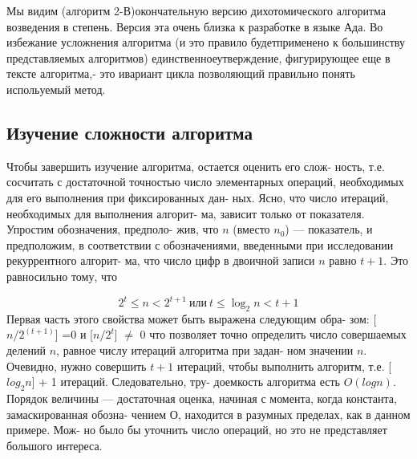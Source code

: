  Мы видим (алгоритм 2-В)окончательную версию дихотомического\linebreak
алгоритма возведения в степень. Версия эта очень близка к разработке \linebreak
в языке Ада. Во избежание усложнения алгоритма (и это правило будет\linebreak применено к большинству представляемых алгоритмов) единственное\linebreak утверждение, фигурирующее еще в тексте алгоритма,- это ивариант\linebreak
 цикла позволяющий правильно понять испольуемый метод.
\newline

\subsection{Изучение сложности алгоритма}
\noindent Чтобы завершить изучение алгоритма, остается оценить его слож­-\linebreak
ность, т.е. сосчитать с достаточной точностью число элементарных\linebreak
операций, необходимых для его выполнения при фиксированных дан­-\linebreak
ных. Ясно, что число итераций, необходимых для выполнения алгорит­-\linebreak
ма, зависит только от показателя. Упростим обозначения, предполо­-\linebreak
жив, что $n$ (вместо $n_0$) — показатель, и предположим, в соответствии с\linebreak
обозначениями, введенными при исследовании рекуррентного алгорит­-\linebreak
ма, что число цифр в двоичной записи $n$ равно $t + 1$. Это равносильно\linebreak
тому, что

\begin{equation*}
  2^t \le n < 2^{t+1} \  {\text {или} }  \  t \le \log_2 n < t+1 
\end{equation*}
Первая часть этого свойства может быть выражена следующим обра­-\linebreak
зом: [$n/2^(t+1)$] =0 и [$n/2^t$] $\not=$ 0 что позволяет точно определить число\linebreak
\noindent совершаемых делений $n$, равное числу итераций алгоритма при задан­-\linebreak
ном значении $n$. Очевидно, нужно совершить $t + 1$ итераций, чтобы\linebreak
выполнить алгоритм, т.е. [$log_2 n$] + 1 итераций. Следовательно, тру­-\linebreak
доемкость алгоритма есть $O(log n)$. Порядок величины — достаточная\linebreak
оценка, начиная с момента, когда константа, замаскированная обозна­-\linebreak
чением О, находится в разумных пределах, как в данном примере. Мож­-\linebreak
но было бы уточнить число операций, но это не представляет большого\linebreak
интереса.
\newline

